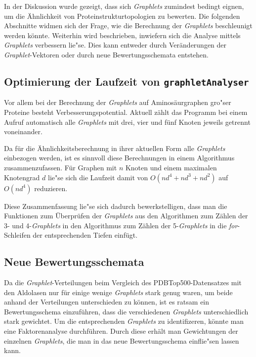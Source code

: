 \documentclass{report}
\begin{document}
In der Diskussion wurde gezeigt, dass sich \textit{Graphlets} zumindest bedingt eignen, um die \"Ahnlichkeit von Proteinstrukturtopologien  zu bewerten. Die folgenden Abschnitte widmen sich der Frage, wie die Berechnung der \textit{Graphlets} beschleunigt werden k\"onnte. Weiterhin wird beschrieben, inwiefern sich die Analyse mittels \textit{Graphlets} verbessern lie"se. Dies kann entweder durch Ver\"anderungen der \textit{Graphlet}-Vektoren oder durch neue Bewertungsschemata entstehen. 

\subsection{Optimierung der Laufzeit von \texttt{graphletAnalyser}}

Vor allem bei der Berechnung der \textit{Graphlets} auf Aminos\"aurgraphen gro"ser Proteine besteht Verbesserungspotential. Aktuell z\"ahlt das Programm bei einem Aufruf automatisch alle \textit{Graphlets} mit drei, vier und f\"unf Knoten jeweils getrennt voneinander.

Da f\"ur die \"Ahnlichkeitsberechnung in ihrer aktuellen Form alle \textit{Graphlets} einbezogen werden, ist es sinnvoll diese Berechnungen in einem Algorithmus zusammenzufassen. F\"ur Graphen mit $n$ Knoten und einem maximalen Knotengrad $d$ lie"se sich die Laufzeit damit von $O(nd^4+nd^3+nd^2)$ auf $O(nd^4)$ reduzieren.

Diese Zusammenfassung lie"se sich dadurch bewerkstelligen, dass man die Funktionen zum \"Uberpr\"ufen der \textit{Graphlets} aus den Algorithmen zum Z\"ahlen der 3- und 4-\textit{Graphlets} in den Algorithmus zum Z\"ahlen der 5-\textit{Graphlets} in die \textit{for}-Schleifen der entsprechenden Tiefen einf\"ugt.

\subsection{Neue Bewertungsschemata}

Da die \textit{Graphlet}-Verteilungen beim Vergleich des PDBTop500-Datensatzes mit den Aldolasen nur f\"ur einige wenige \textit{Graphlets} stark genug waren, um beide anhand der Verteilungen unterschieden zu k\"onnen, ist es ratsam ein Bewertungsschema einzuf\"uhren, dass die verschiedenen \textit{Graphlets} unterschiedlich stark gewichtet. Um die entsprechenden \textit{Graphlets} zu identifizeren, k\"onnte man eine Faktorenanalyse durchf\"uhren. Durch diese erh\"alt man Gewichtungen der einzelnen \textit{Graphlets}, die man in das neue Bewertungsschema einflie"sen lassen kann.
\end{document}
